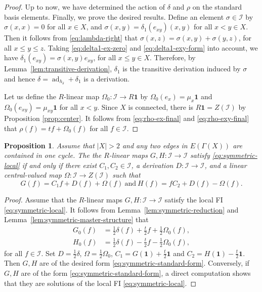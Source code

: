 \documentclass[reqno]{amsart}
\numberwithin{equation}{section}
\theoremstyle{plain}
\newtheorem{proposition}[theorem]{Proposition}
\theoremstyle{definition}
\newcommand{\I}{\mathcal I}
\newcommand{\one}{\mathbf 1}
\newcommand{\ad}{\operatorname{ad}}
\begin{document}
\begin{proof}
Up to now, we have determined the action of $\delta$ and $\rho$ on the standard basis elements.
Finally, we prove the desired results. Define an element $\sigma \in \I$ by $\sigma(x,x)=0$ for all $x\in X$, and
$\sigma(x,y)=\delta_1(e_{xy})(x,y)$ for all $x<y\in X$.
Then it follows from \eqref{eq:lambda-right} that
$\sigma(x,z)=\sigma(x,y)+\sigma(y,z)$, for all $x\leq y\leq z$.
Taking \eqref{eq:delta1-ex-zero} and \eqref{eq:delta1-exy-form} into account, we have
$\delta_1(e_{xy})=\sigma(x,y)e_{xy}$, for all $x\leq y\in X$. Therefore, by Lemma~\ref{lem:transitive-derivation},
$\delta_1$ is the transitive derivation induced by $\sigma$ and hence $\delta=\ad_{h_\delta}+\delta_1$ is a derivation.

Let us define the $R$-linear map $\Omega_0:\I\to R\one$ by
$\Omega_0(e_x)=\mu_x\one$ and $\Omega_0(e_{xy})=\mu_{xy}\one$ for all $x<y$.
Since $X$ is connected, there is $R\one=Z(\I)$ by Proposition \ref{prop:center}.
It follows from \eqref{eq:rho-ex-final} and \eqref{eq:rho-exy-final} that
$\rho(f)=tf+\Omega_0(f)$ for all $f\in\I$.
\end{proof}

\begin{proposition}\label{thm:symmetric-standard-form}
Assume that $|X|>2$ and any two edges in $E(\Gamma(X))$ are contained in one cycle.
The the $R$-linear maps $G,H:\I\to\I$ satisfy \eqref{eq:symmetric-local} if and only if
there exist $C_1,C_2\in\I$, a derivation
$D:\I\to\I$, and a linear central-valued map
$\Omega:\I\to Z(\I)$ such that
\begin{equation}\label{eq:symmetric-standard-form}
G(f)=C_1f+D(f)+\Omega(f)~\text{and}~
H(f)=fC_2+D(f)-\Omega(f).
\end{equation}
\end{proposition}

\begin{proof}
Assume that the $R$-linear maps $G,H:\I\to\I$ satisfy the local FI \eqref{eq:symmetric-local}.
It follows from Lemma~\ref{lem:symmetric-reduction} and Lemma~\ref{lem:symmetric-master-structure} that
\[
\begin{aligned}
G_0(f)
&=\frac12\delta(f)+\frac t2f+\frac12\Omega_0(f),\\
H_0(f)
&=\frac12\delta(f)-\frac t2f-\frac12\Omega_0(f),
\end{aligned}
\]
for all $f\in \I$. Set $D=\frac{1}{2}\delta$, $\Omega=\frac{1}{2}\Omega_0$,
$C_1=G(\one)+\frac{t}{2}\one$ and $C_2=H(\one)-\frac{t}{2}\one$.
Then $G,H$ are of the desired form \eqref{eq:symmetric-standard-form}.
Conversely, if $G,H$ are of the form \eqref{eq:symmetric-standard-form},
a direct computation shows that they are solutions of the local FI \eqref{eq:symmetric-local}.
\end{proof}
\end{document}
